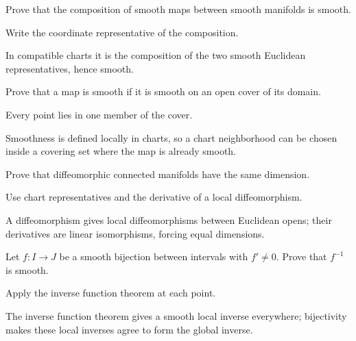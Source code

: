 \begin{exercise}\label{exr:vii03-ped-06}
Prove that the composition of smooth maps between smooth manifolds is smooth.
\end{exercise}
\begin{hint}
Write the coordinate representative of the composition.
\end{hint}
\begin{solution}
In compatible charts it is the composition of the two smooth Euclidean representatives, hence smooth.
\end{solution}

\begin{exercise}\label{exr:vii03-ped-07}
Prove that a map is smooth if it is smooth on an open cover of its domain.
\end{exercise}
\begin{hint}
Every point lies in one member of the cover.
\end{hint}
\begin{solution}
Smoothness is defined locally in charts, so a chart neighborhood can be chosen inside a covering set where the map is already smooth.
\end{solution}

\begin{exercise}\label{exr:vii03-ped-08}
Prove that diffeomorphic connected manifolds have the same dimension.
\end{exercise}
\begin{hint}
Use chart representatives and the derivative of a local diffeomorphism.
\end{hint}
\begin{solution}
A diffeomorphism gives local diffeomorphisms between Euclidean opens; their derivatives are linear isomorphisms, forcing equal dimensions.
\end{solution}

\begin{exercise}\label{exr:vii03-ped-09}
Let \(f:I\to J\) be a smooth bijection between intervals with \(f'\neq0\).  Prove that \(f^{-1}\) is smooth.
\end{exercise}
\begin{hint}
Apply the inverse function theorem at each point.
\end{hint}
\begin{solution}
The inverse function theorem gives a smooth local inverse everywhere; bijectivity makes these local inverses agree to form the global inverse.
\end{solution}

